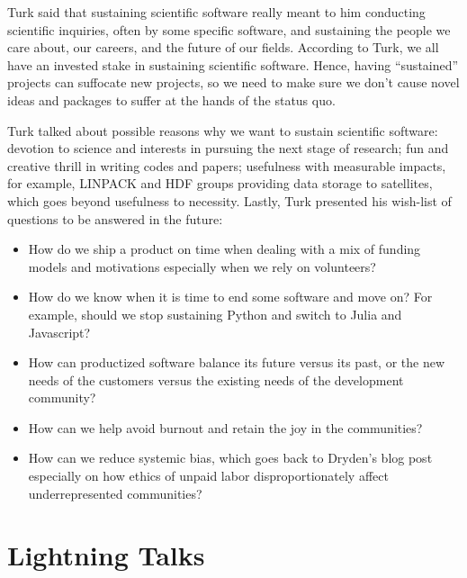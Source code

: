 \documentclass[11pt, oneside]{amsart}
\newcommand{\note}[1]{ {\textcolor{blueish}    { ***Note:      #1 }}}
\begin{document}
Turk said that sustaining scientific software really meant to him conducting
scientific inquiries, often by some specific software, and sustaining the people
we care about, our careers, and the future of our fields. According to Turk, we
all have an invested stake in sustaining scientific software. Hence, having
``sustained'' projects can suffocate new projects, so we need to make sure we
don't cause novel ideas and packages to suffer at the hands of the status quo.

Turk talked about possible reasons why we want to sustain scientific software:
devotion to science and interests in pursuing the next stage of research; fun
and creative thrill in writing codes and papers; usefulness with measurable
impacts, for example, LINPACK and HDF groups providing data storage to
satellites, which goes beyond usefulness to necessity. Lastly, Turk presented
his wish-list of questions to be answered in the future:
%
\begin{itemize} 

\item How do we ship a product on time when dealing with a mix of funding models
and motivations especially when we rely on volunteers?

\item How do we know when it is time to end some software and move on? For
example, should we stop sustaining Python and switch to Julia and Javascript?
 
\item How can productized software balance its future versus its past, or the
new needs of the customers versus the existing needs of the development
community?

\item How can we help avoid burnout and retain the joy in the communities?

\item How can we reduce systemic bias, which goes back to Dryden's blog post
especially on how ethics of unpaid labor disproportionately affect
underrepresented communities?

\end{itemize}

\section{Lightning Talks} \label{sec:lightning}
\begin{comment}
\note{
\href{http://wssspe.researchcomputing.org.uk/wssspe3/agenda/}{Slides.}}
\end{comment}
\end{document}
